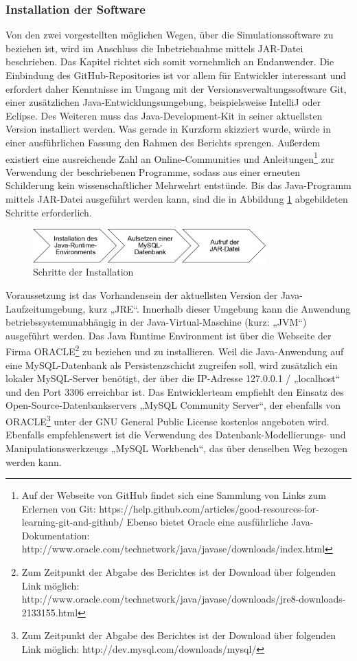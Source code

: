 \documentclass[12pt,titlepage]{article}
\begin{document}
\subsubsection{Installation der Software}
Von den zwei vorgestellten möglichen Wegen, über die Simulationssoftware zu beziehen ist, wird im Anschluss die Inbetriebnahme mittels JAR-Datei beschrieben. Das Kapitel richtet sich somit vornehmlich an Endanwender.
Die Einbindung des GitHub-Repositories ist vor allem für Entwickler interessant und erfordert daher Kenntnisse im Umgang mit der Versionsverwaltungssoftware Git, einer zusätzlichen Java-Entwicklungsumgebung, beispielsweise IntelliJ oder Eclipse. Des Weiteren muss das Java-Development-Kit in seiner aktuellsten Version installiert werden. Was gerade in Kurzform skizziert wurde, würde in einer ausführlichen Fassung den Rahmen des Berichts sprengen. Außerdem existiert eine ausreichende Zahl an Online-Communities und Anleitungen\footnote{Auf der Webseite von GitHub findet sich eine Sammlung von Links zum Erlernen von Git: https://help.github.com/articles/good-resources-for-learning-git-and-github/
Ebenso bietet Oracle eine ausführliche Java-Dokumentation: http://www.oracle.com/technetwork/java/javase/downloads/index.html} zur Verwendung der beschriebenen Programme, sodass aus einer erneuten Schilderung kein wissenschaftlicher Mehrwehrt entstünde.
Bis das Java-Programm mittels JAR-Datei ausgeführt werden kann, sind die in Abbildung \ref{fig:ErgSoftwareInst1} abgebildeten Schritte erforderlich.
\begin{figure}[!ht]
	\centering
	\includegraphics[width=0.8\textwidth]{ErgSoftwareInst1}
	\caption{Schritte der Installation}
	\label{fig:ErgSoftwareInst1}
\end{figure}
Voraussetzung ist das Vorhandensein der aktuellsten Version der Java-Laufzeitumgebung, kurz „JRE“. Innerhalb dieser Umgebung kann die Anwendung betriebssystemunabhängig in der Java-Virtual-Maschine (kurz: „JVM“) ausgeführt werden. Das Java Runtime Environment ist über die Webseite der Firma ORACLE\footnote{Zum Zeitpunkt der Abgabe des Berichtes ist der Download über folgenden Link möglich: http://www.oracle.com/technetwork/java/javase/downloads/jre8-downloads-2133155.html} zu beziehen und zu installieren.
Weil die Java-Anwendung auf eine MySQL-Datenbank als Persistenzschicht zugreifen soll, wird zusätzlich ein lokaler MySQL-Server benötigt, der über die IP-Adresse 127.0.0.1 / „localhost“ und den Port 3306 erreichbar ist. Das Entwicklerteam empfiehlt den Einsatz des Open-Source-Datenbankservers „MySQL Community Server“, der ebenfalls von ORACLE\footnote{Zum Zeitpunkt der Abgabe des Berichtes ist der Download über folgenden Link möglich: http://dev.mysql.com/downloads/mysql/} unter der GNU General Public License kostenlos angeboten wird. Ebenfalls empfehlenswert ist die Verwendung des Datenbank-Modellierungs- und Manipulationswerkzeugs „MySQL Workbench“, das über denselben Weg bezogen werden kann.
\end{document}
